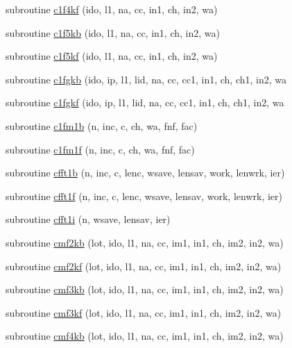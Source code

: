 \begin{DoxyCompactItemize}
\item 
subroutine \mbox{\hyperlink{namespacefftclass_a4121c0b7de23d7df058852fb75a9a31a}{c1f4kf}} (ido, l1, na, cc, in1, ch, in2, wa)
\item 
subroutine \mbox{\hyperlink{namespacefftclass_aa356856107611ad66966fed70ede74f1}{c1f5kb}} (ido, l1, na, cc, in1, ch, in2, wa)
\item 
subroutine \mbox{\hyperlink{namespacefftclass_a21d2647f4c2392ed5498288f99a3203c}{c1f5kf}} (ido, l1, na, cc, in1, ch, in2, wa)
\item 
subroutine \mbox{\hyperlink{namespacefftclass_af3a0a7ee1c2b801d9ff55c016cdc13f4}{c1fgkb}} (ido, ip, l1, lid, na, cc, cc1, in1, ch, ch1, in2, wa
\item 
subroutine \mbox{\hyperlink{namespacefftclass_aa48f7f35412e5994c6fe459ad6f8c46d}{c1fgkf}} (ido, ip, l1, lid, na, cc, cc1, in1, ch, ch1, in2, wa
\item 
subroutine \mbox{\hyperlink{namespacefftclass_a2f5368919279e1986ee34764caa05fe0}{c1fm1b}} (n, inc, c, ch, wa, fnf, fac)
\item 
subroutine \mbox{\hyperlink{namespacefftclass_a8870afa6b2bab24460d719026aa6e0d8}{c1fm1f}} (n, inc, c, ch, wa, fnf, fac)
\item 
subroutine \mbox{\hyperlink{namespacefftclass_acc0dd0d3644e3ff67fd2dfb23dcb4e40}{cfft1b}} (n, inc, c, lenc, wsave, lensav, work, lenwrk, ier)
\item 
subroutine \mbox{\hyperlink{namespacefftclass_a4cc16a9191f915424a42d281f821c291}{cfft1f}} (n, inc, c, lenc, wsave, lensav, work, lenwrk, ier)
\item 
subroutine \mbox{\hyperlink{namespacefftclass_a7aaa42c1b45fc7175f2560cd023e4487}{cfft1i}} (n, wsave, lensav, ier)
\item 
subroutine \mbox{\hyperlink{namespacefftclass_a718a5d0ac7052a9bcbcb9db18430dd61}{cmf2kb}} (lot, ido, l1, na, cc, im1, in1, ch, im2, in2, wa)
\item 
subroutine \mbox{\hyperlink{namespacefftclass_a87e04f91c6fd5a8be5cce797b134f4c3}{cmf2kf}} (lot, ido, l1, na, cc, im1, in1, ch, im2, in2, wa)
\item 
subroutine \mbox{\hyperlink{namespacefftclass_afc9e57527719d38dc3716ee9bf6b090d}{cmf3kb}} (lot, ido, l1, na, cc, im1, in1, ch, im2, in2, wa)
\item 
subroutine \mbox{\hyperlink{namespacefftclass_a449e799516aa491a87b0f5937a7abc86}{cmf3kf}} (lot, ido, l1, na, cc, im1, in1, ch, im2, in2, wa)
\item 
subroutine \mbox{\hyperlink{namespacefftclass_ad51087e9f2795e7bf337d4c6b55de780}{cmf4kb}} (lot, ido, l1, na, cc, im1, in1, ch, im2, in2, wa)

\end{DoxyCompactItemize}
